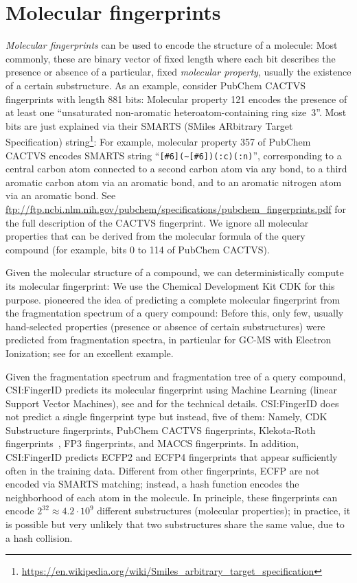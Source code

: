 \documentclass[letterpaper,10pt,openany,oneside]{sphinxmanual}
\begin{document}
\section{Molecular fingerprints}

\emph{Molecular fingerprints} can be used to encode the structure of a
molecule: Most commonly, these are binary vector of fixed length where each
bit describes the presence or absence of a particular, fixed \emph{molecular
property}, usually the existence of a certain substructure.  As an example,
consider PubChem CACTVS fingerprints with length 881 bits: Molecular property
121 encodes the presence of at least one ``unsaturated non-aromatic
heteroatom-containing ring size~3''.  Most bits are just explained via their
SMARTS (SMiles ARbitrary Target Specification)
string\footnote{\sphinxAtStartFootnote%
\url{https://en.wikipedia.org/wiki/Smiles_arbitrary_target_specification}}:
For example, molecular property 357 of PubChem CACTVS encodes SMARTS string
``\verb=[#6](~[#6])(:c)(:n)='', corresponding to a central carbon atom
connected to a second carbon atom via any bond, to a third aromatic carbon
atom via an aromatic bond, and to an aromatic nitrogen atom via an aromatic
bond.
See \url{ftp://ftp.ncbi.nlm.nih.gov/pubchem/specifications/pubchem_fingerprints.pdf}
for the full description of the CACTVS fingerprint. We ignore all molecular
properties that can be derived from the molecular formula of the query
compound (for example, bits 0 to 114 of PubChem CACTVS).

Given the molecular structure of a compound, we can deterministically compute
its molecular fingerprint: We use the Chemical Development Kit CDK
\citep{steinbeck03chemistry, steinbeck06recent, willighagen17chemistry} for
this purpose.  \citet{heinonen12metabolite} pioneered the idea of predicting
a complete molecular fingerprint from the fragmentation spectrum of a query
compound: Before this, only few, usually hand-selected properties (presence
or absence of certain substructures) were predicted from fragmentation
spectra, in particular for GC-MS with Electron Ionization;
see \citet{curry90msnet} for an excellent example.

Given the fragmentation spectrum and fragmentation tree of a query compound,
CSI:FingerID predicts its molecular fingerprint using Machine Learning
(linear Support Vector Machines), see \citet{shen14metabolite}
and \citet{duehrkop15searching} for the technical details.  CSI:FingerID does
not predict a single fingerprint type but instead, five of them: Namely, CDK
Substructure fingerprints, PubChem CACTVS fingerprints, Klekota-Roth
fingerprints~\citep{klekota08chemical}, FP3 fingerprints, and MACCS
fingerprints.  In addition, CSI:FingerID predicts ECFP2 and ECFP4 fingerprints
\citep{rogers10extended} that appear sufficiently often in the training data.
Different from other fingerprints, ECFP are not encoded via SMARTS matching;
instead, a hash function encodes the neighborhood of each atom in the
molecule.  In principle, these fingerprints can encode $2^{32} \approx
4.2 \cdot 10^9$ different substructures (molecular properties); in practice,
it is possible but very unlikely that two substructures share the same value,
due to a hash collision.
\end{document}
